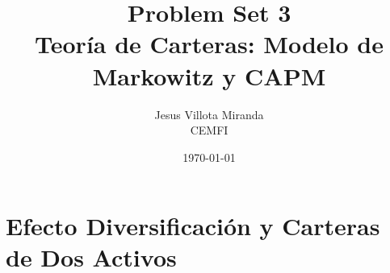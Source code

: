 \documentclass[12pt,a4paper]{article}
\title{\textbf{Problem Set 3}\\\large Teoría de Carteras: Modelo de Markowitz y CAPM}
\author{Jesus Villota Miranda\\CEMFI}
\date{\today}
\begin{document}



\section{Efecto Diversificación y Carteras de Dos Activos}
\end{document}
